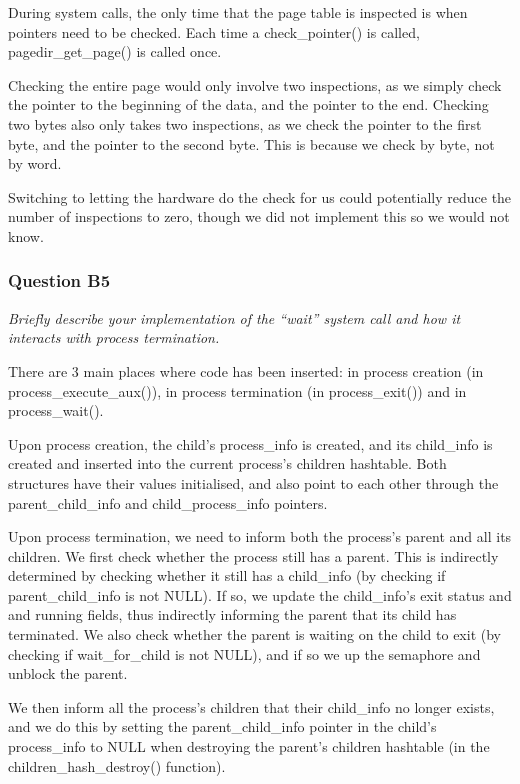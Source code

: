 During system calls, the only time that the page table is inspected is when
pointers need to be checked.  Each time a check\_pointer() is called,
pagedir\_get\_page() is called once.

Checking the entire page would only involve two inspections, as we simply check
the pointer to the beginning of the data, and the pointer to the end.  Checking
two bytes also only takes two inspections, as we check the pointer to the first
byte, and the pointer to the second byte. This is because we check by byte, not
by word.

Switching to letting the hardware do the check for us could potentially reduce
the number of inspections to zero, though we did not implement this so we would
not know.

\subsubsection*{Question B5} %
\textit{Briefly describe your implementation of the ``wait'' system call and how it interacts with process termination.}

There are 3 main places where code has been inserted: in process creation (in process\_execute\_aux()), in process termination (in process\_exit()) and in process\_wait().

Upon process creation, the child's process\_info is created, and its child\_info is created and inserted into the current process's children hashtable. Both structures have their values initialised, and also point to each other through the parent\_child\_info and child\_process\_info pointers.

Upon process termination, we need to inform both the process's parent and all its children. We first check whether the process still has a parent. This is indirectly determined by checking whether it still has a child\_info (by checking if parent\_child\_info is not NULL). If so, we update the child\_info's exit status and and running fields, thus indirectly informing the parent that its child has terminated. We also check whether the parent is waiting on the child to exit (by checking if wait\_for\_child is not NULL), and if so we up the semaphore and unblock the parent.

We then inform all the process's children that their child\_info no longer exists, and we do this by setting the parent\_child\_info pointer in the child's process\_info to NULL when destroying the parent's children hashtable (in the children\_hash\_destroy() function).

